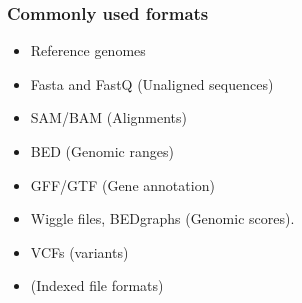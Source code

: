 \documentclass{beamer}
\begin{document}
\begin{frame}
  \frametitle{Commonly used formats}
  \begin{itemize}

  \item  Reference genomes

  \item  Fasta and FastQ (Unaligned sequences)
 
  \item SAM/BAM (Alignments)
 
  \item BED (Genomic ranges)
 
  \item GFF/GTF (Gene annotation)
 
  \item Wiggle files, BEDgraphs (Genomic scores).
 

  \item VCFs (variants)

  \item (Indexed file formats)


  \end{itemize}
\end{frame}






\end{document}

